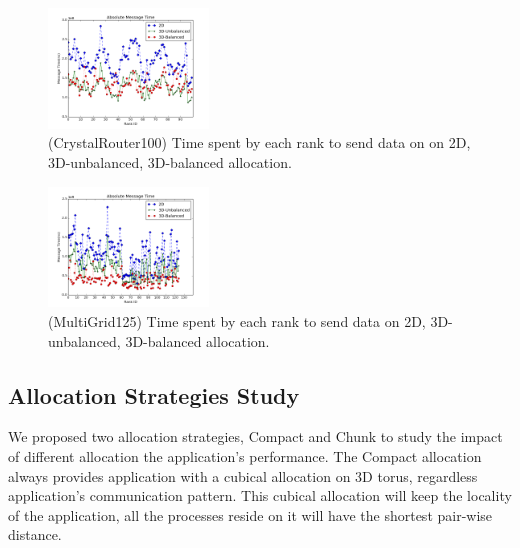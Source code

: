\documentclass[conference]{IEEEtran}
\begin{document}
\begin{figure}[h!] 
  \centering
  \includegraphics[width=0.38\textwidth]{figs/shapestudy/cr100_rank_msgtime}
   \caption{(CrystalRouter100) Time spent by each rank to send data on on 2D, 3D-unbalanced, 3D-balanced allocation.}
   \label{fig: shapestudy-cr100}
\end{figure}

\begin{figure}[h!] 
  \centering
  \includegraphics[width=0.38\textwidth]{figs/shapestudy/mg125_rank_msgtime}
   \caption{(MultiGrid125) Time spent by each rank to send data on 2D, 3D-unbalanced, 3D-balanced allocation.}
   \label{fig: shapestudy-mg125}
\end{figure}

\subsection{Allocation Strategies Study}
\label{sec: alloc strategy study}

We proposed two allocation strategies, Compact and Chunk to study the impact of different allocation the application's performance. The Compact allocation always provides application with a cubical allocation on 3D torus, regardless application's communication pattern. This cubical allocation will keep the locality of the application, all the processes reside on it will have the shortest pair-wise distance. 
\end{document}
